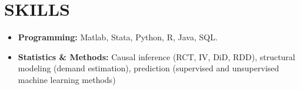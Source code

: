 \documentclass[letter,9pt]{extarticle}
\begin{document}
\section*{SKILLS}
\begin{itemize}
    \item \textbf{Programming:} Matlab, Stata, Python, R, Java, SQL.
    \item \textbf{Statistics \& Methods:} Causal inference (RCT, IV, DiD, RDD), structural modeling (demand estimation), prediction  (supervised and unsupervised machine learning methods)
\end{itemize}

\end{document}
